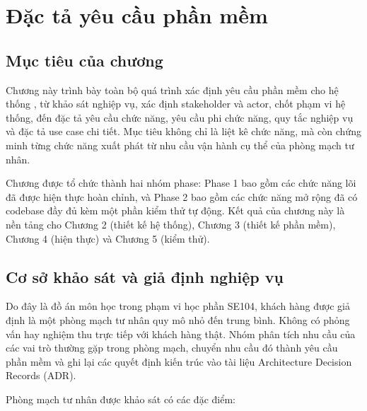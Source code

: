 \chapter{Đặc tả yêu cầu phần mềm}
\label{chap:srs}

\section{Mục tiêu của chương}
\label{sec:srs-objective}

Chương này trình bày toàn bộ quá trình xác định yêu cầu phần mềm cho hệ thống \projecttitle{}, từ khảo sát nghiệp vụ, xác định stakeholder và actor, chốt phạm vi hệ thống, đến đặc tả yêu cầu chức năng, yêu cầu phi chức năng, quy tắc nghiệp vụ và đặc tả use case chi tiết. Mục tiêu không chỉ là liệt kê chức năng, mà còn chứng minh từng chức năng xuất phát từ nhu cầu vận hành cụ thể của phòng mạch tư nhân.

Chương được tổ chức thành hai nhóm phase: Phase 1 bao gồm các chức năng lõi đã được hiện thực hoàn chỉnh, và Phase 2 bao gồm các chức năng mở rộng đã có codebase đầy đủ kèm một phần kiểm thử tự động. Kết quả của chương này là nền tảng cho Chương 2 (thiết kế hệ thống), Chương 3 (thiết kế phần mềm), Chương 4 (hiện thực) và Chương 5 (kiểm thử).

\section{Cơ sở khảo sát và giả định nghiệp vụ}
\label{sec:srs-survey-basis}

Do đây là đồ án môn học trong phạm vi học phần SE104, khách hàng được giả định là một phòng mạch tư nhân quy mô nhỏ đến trung bình. Không có phỏng vấn hay nghiệm thu trực tiếp với khách hàng thật. Nhóm phân tích nhu cầu của các vai trò thường gặp trong phòng mạch, chuyển nhu cầu đó thành yêu cầu phần mềm và ghi lại các quyết định kiến trúc vào tài liệu Architecture Decision Records (ADR).

Phòng mạch tư nhân được khảo sát có các đặc điểm:

